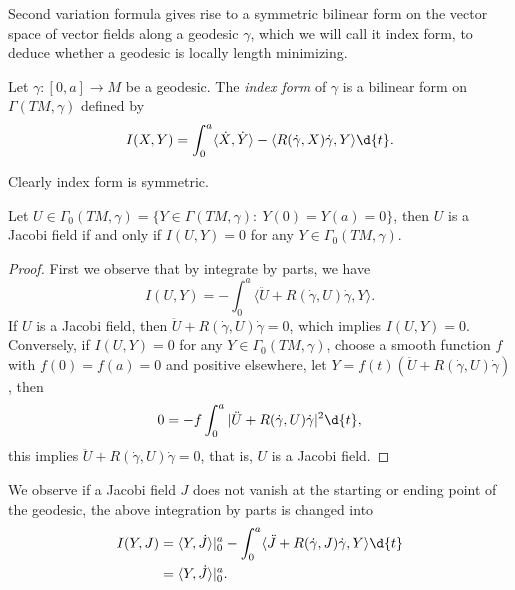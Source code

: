 Second variation formula gives rise to a symmetric bilinear form on the vector space of vector fields along a geodesic $\gamma$, which we will call it index form, to deduce whether a geodesic is locally length minimizing.

\begin{defn}
    Let $\gamma:[0,a]\to M$ be a geodesic.
    The \emph{index form} of $\gamma$ is a bilinear form on $\Gamma(TM,\gamma)$ defined by
    \[I(X,Y)=\int_0^a\langle\dot{X},\dot{Y}\rangle-\langle R(\dot\gamma,X)\dot\gamma,Y\rangle\d{t}.\]
\end{defn}

Clearly index form is symmetric.

\begin{lem}\label{Jacobi field as null space}
    Let $U\in\Gamma_0(TM,\gamma)=\{Y\in\Gamma(TM,\gamma):\ Y(0)=Y(a)=0\}$, then $U$ is a Jacobi field if and only if $I(U,Y)=0$ for any $Y\in\Gamma_0(TM,\gamma)$.
\end{lem}
\begin{proof}
    First we observe that by integrate by parts, we have
    \[I(U,Y)=-\int_0^a\langle\ddot{U}+R(\dot\gamma,U)\dot\gamma,Y\rangle.\]
    If $U$ is a Jacobi field, then $\ddot{U}+R(\dot\gamma,U)\dot\gamma=0$, which implies $I(U,Y)=0$.
    Conversely, if $I(U,Y)=0$ for any $Y\in\Gamma_0(TM,\gamma)$, choose a smooth function $f$ with $f(0)=f(a)=0$ and positive elsewhere, let $Y=f(t)(\ddot{U}+R(\dot\gamma,U)\dot\gamma)$, then
    \[0=-f\int_0^a|\ddot{U}+R(\dot\gamma,U)\dot\gamma|^2\d{t},\]
    this implies $\ddot{U}+R(\dot\gamma,U)\dot\gamma=0$, that is, $U$ is a Jacobi field.
\end{proof}

We observe if a Jacobi field $J$ does not vanish at the starting or ending point of the geodesic, the above integration by parts is changed into
\begin{align*}
    I(Y,J)&=\langle Y,\dot{J}\rangle|_0^a-\int_0^a\langle\ddot{J}+R(\dot\gamma,J)\dot\gamma,Y\rangle\d{t}\\
    &=\langle Y,\dot{J}\rangle|_0^a.
\end{align*}

